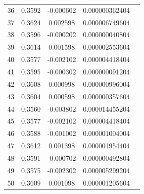 \begin{center}
\begin{table}[h!]
\begin{tabular}{|c|c|c|c|c|}
36 & 0.3592 & -0.000602 & 0.000000362404 \\
37 & 0.3624 & 0.002598 & 0.000006749604 \\
38 & 0.3596 & -0.000202 & 0.000000040804 \\
39 & 0.3614 & 0.001598 & 0.000002553604 \\
40 & 0.3577 & -0.002102 & 0.000004418404 \\
41 & 0.3595 & -0.000302 & 0.000000091204 \\
42 & 0.3608 & 0.000998 & 0.000000996004 \\
43 & 0.3604 & 0.000598 & 0.000000357604 \\
44 & 0.3560 & -0.003802 & 0.000014455204 \\
45 & 0.3577 & -0.002102 & 0.000004418404 \\
46 & 0.3588 & -0.001002 & 0.000001004004 \\
47 & 0.3612 & 0.001398 & 0.000001954404 \\
48 & 0.3591 & -0.000702 & 0.000000492804 \\
49 & 0.3575 & -0.002302 & 0.000005299204 \\
50 & 0.3609 & 0.001098 & 0.000001205604 \\
\hline
\end{tabular}
\end{table}
\end{center}

